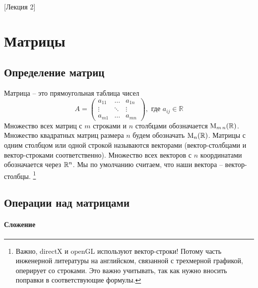 [Лекция 2]


\newpage

\section{Матрицы}

\subsection{Определение матриц}

Матрица -- это прямоугольная таблица чисел
\[
A=
\begin{pmatrix}
a_{11}&\ldots& a_{1n}\\
\vdots&\ddots&\vdots\\
a_{m1}& \ldots &a_{mn}
\end{pmatrix},\text{ где } a_{ij}\in \mathbb R
\]
Множество всех матриц с $m$ строками и $n$ столбцами обозначается $\operatorname{M}_{m\,n}(\mathbb R)$.
Множество квадратных матриц размера $n$ будем обозначать $\operatorname{M}_{n}(\mathbb R)$.
Матрицы с одним столбцом или одной строкой называются векторами (вектор-столбцами и вектор-строками соответственно).
Множество всех векторов с $n$ координатами обозначается через $\mathbb R^{n}$.
Мы по умолчанию считаем, что наши вектора -- вектор-столбцы.%
\footnote{Важно, directX и openGL используют вектор-строки!
Потому часть инженерной литературы на английском, связанной с трехмерной графикой, оперирует со строками.
Это важно учитывать, так как нужно вносить поправки в соответствующие формулы.}

\subsection{Операции над матрицами}

\paragraph{Сложение}

